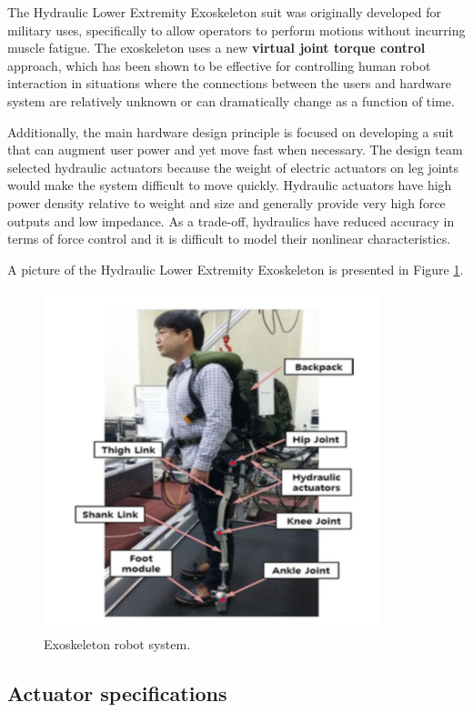 \begin{refsection}

The Hydraulic Lower Extremity Exoskeleton suit was originally developed for military uses, specifically to allow operators to perform motions without incurring muscle fatigue.  The exoskeleton uses a new {\bf virtual joint torque control} approach, which has been shown to be effective for controlling human robot interaction in situations where the connections between the users and hardware system are relatively unknown or can dramatically change as a function of time.

Additionally, the main hardware design principle is focused on developing a suit that can augment user power and yet move fast when necessary.  The design team selected hydraulic actuators because the weight of electric actuators on leg joints would make the system difficult to move quickly.  Hydraulic actuators have high power density relative to weight and size and generally provide very high force outputs and low impedance.  As a trade-off, hydraulics have reduced accuracy in terms of force control and it is difficult to model their nonlinear characteristics.  

A picture of the Hydraulic Lower Extremity Exoskeleton is presented in Figure \ref{fig:exoSuit}.
\begin{figure}[thpb]
\centering
\includegraphics[width=3.in]{exos/figs/hydLowerExrem/exoSuit}
  \caption{Exoskeleton robot system.}
 \label{fig:exoSuit}   
 \end{figure} 
 

\subsection{Actuator specifications}


\end{refsection}
